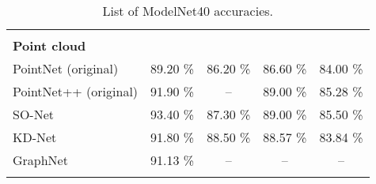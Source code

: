 \begin{table}[]
\begin{tabular}{lcccc}
		                       &                    &                       &                    &                       \\
		\textbf{Point cloud  } &                    &                       &                    &                       \\
		PointNet (original)    &      89.20 \%      &       86.20 \%        &      86.60 \%      &       84.00 \%        \\
		PointNet++ (original)  &      91.90 \%      &          --           &      89.00 \%      &       85.28 \%        \\
		SO-Net                 &      93.40 \%      &       87.30 \%        &      89.00 \%      &       85.50 \%        \\
		KD-Net                 &      91.80 \%      &       88.50 \%        &      88.57 \%      &       83.84 \%        \\
		GraphNet               &      91.13 \%      &          --           &         --         &          --           \\
		                       &                    &                       &                    &                       \\ \hline
	\end{tabular}
\caption{List of ModelNet40 accuracies.}
\label{Table:accs}
\end{table}